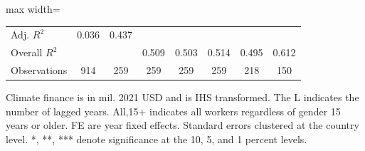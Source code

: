 \begin{table}[htbp]
\begin{adjustbox}{max width=\textwidth}
\begin{tabular}{l*{7}{c}}
Adj. $ R^2$         &       0.036   &       0.437   &               &               &               &               &               \\
Overall $ R^2$      &               &               &       0.509   &       0.503   &       0.514   &       0.495   &       0.612   \\
Observations        &         914   &         259   &         259   &         259   &         259   &         218   &         150   \\
\bottomrule \end{tabular} \end{adjustbox} \begin{center} \begin{minipage}{0.7\textwidth} \footnotesize \flushleft Climate finance is in mil. 2021 USD and is IHS transformed. The L indicates the number of lagged years. All,15+ indicates all workers regardless of gender 15 years or older. FE are year fixed effects. Standard errors clustered at the country level. *, **, *** denote significance at the 10, 5, and 1 percent levels. \end{minipage} \end{center} \end{table}
